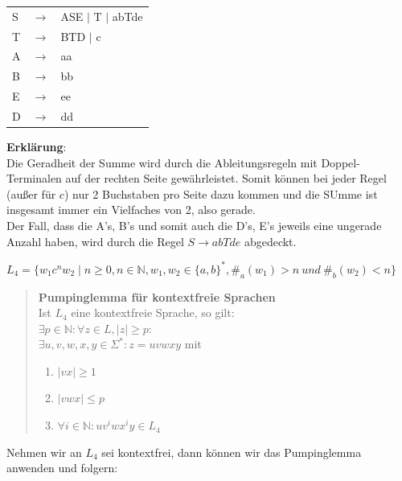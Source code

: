 \begin{teile}
	\begin{tabular}{lcl}
		S  & $\rightarrow$ & ASE $\mid$ T $\mid$ abTde \\
		T  & $\rightarrow$ & BTD $\mid$ c \\
		A & $\rightarrow$ & aa \\
		B & $\rightarrow$ & bb \\
		E  & $\rightarrow$ & ee \\
		D  & $\rightarrow$ & dd \\
	\end{tabular}
	
	\textbf{Erklärung}: \\
	Die Geradheit der Summe wird durch die Ableitungsregeln mit Doppel-Terminalen auf der rechten Seite gewährleistet. Somit können bei jeder Regel (außer für $c$) nur 2 Buchstaben pro Seite dazu kommen und die SUmme ist insgesamt immer ein Vielfaches von 2, also gerade.\\
	Der Fall, dass die A's, B's und somit auch die D's, E's jeweils eine ungerade Anzahl haben, wird durch die Regel $S \rightarrow abTde$ abgedeckt.
	\vspace{0.3cm}
	
	\item
	$L_4 = \{w_1c^nw_2 \mid n \geq 0, n \in \mathbb{N}, w_1,w_2 \in \{a,b\}^*, \#_a(w_1)>n\ und\ \#_b(w_2)<n\}$	

	\begin{quote}
	\textbf{Pumpinglemma für kontextfreie Sprachen} \\
	Ist $L_4$ eine kontextfreie Sprache, so gilt: \\
	$\exists p \in \mathbb{N}: \forall z \in L, |z| \geq p:$ \\
	$\exists u,v,w,x,y \in \Sigma^*: z = uvwxy$ mit
	\begin{enumerate}
		\item $|vx| \geq 1$
		\item $|vwx| \leq p$
		\item $\forall i \in \mathbb{N} : uv^{i}wx^{i}y \in L_4$
	\end{enumerate}
	\end{quote}

	Nehmen wir an $L_4$ sei kontextfrei, dann können wir das Pumpinglemma anwenden und folgern:
	

\end{teile}
